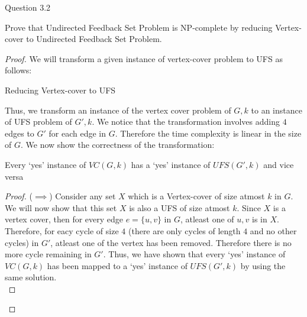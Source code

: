 \begin{solution}{Question 3.2}\label{ques:32}
    \begin{question}
      Prove that Undirected Feedback Set Problem is NP-complete by reducing Vertex-cover to Undirected Feedback Set Problem.
    \end{question}
    \tcblower{}
    \begin{proof}
      We will transform a given instance of vertex-cover problem to UFS as follows:
      \begin{algorithm}[H]
        \caption{Reducing Vertex-cover to UFS}
        \begin{algorithmic}
            \EndFor{}
          \EndProcedure{}
        \end{algorithmic}
      \end{algorithm}
      Thus, we transform an instance of the vertex cover problem of $G, k$ to an instance of UFS problem of $G', k$. We notice that the transformation involves adding $4$ edges to $G'$ for each edge in $G$. Therefore the time complexity is linear in the size of $G$. We now show the correctness of the transformation:
      \begin{claim}
        Every `yes' instance of $VC(G, k)$ has a `yes' instance of $UFS(G', k)$ and vice versa
      \end{claim}
      \begin{proof}
        ($\implies$) Consider any set $X$ which is a Vertex-cover of size atmost $k$ in $G$. We will now show that this set $X$ is also a UFS of size atmost $k$. Since $X$ is a vertex cover, then for every edge $e = \{u, v\}$ in $G$, atleast one of $u, v$ is in $X$. Therefore, for eacy cycle of size $4$ (there are only cycles of length $4$ and no other cycles) in $G'$, atleast one of the vertex has been removed. Therefore there is no more cycle remaining in $G'$. Thus, we have shown that every `yes' instance of $VC(G, k)$ has been mapped to a `yes' instance of $UFS(G', k)$ by using the same solution.\\

\end{proof}
\end{proof}
\end{solution}
